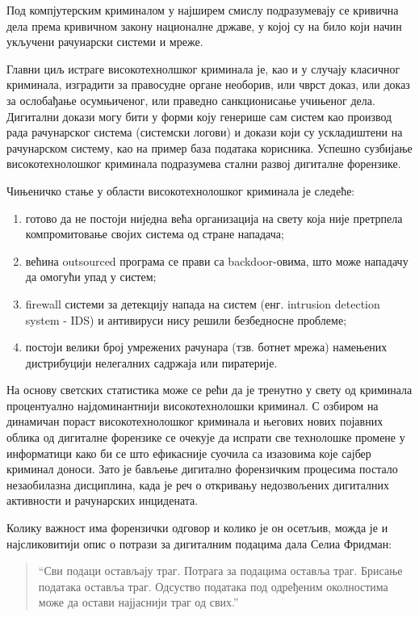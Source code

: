 \documentclass[a4paper]{article}
\begin{document}
        Под компјутерским криминалом у најширем смислу подразумевају се кривична дела према кривичном закону националне државе, у којој су на било који начин укључени рачунарски системи и мреже.

        Главни циљ истраге високотехнолшког криминала је, као и у случају класичног криминала, изградити за правосудне органе необорив, или чврст доказ, или доказ за ослобађање осумњиченог, или праведно санкционисање учињеног дела.
        Дигитални докази могу бити у форми коју генерише сам систем као производ рада рачунарског система (системски логови) и докази који су ускладиштени на рачунарском систему, као на пример база података корисника.
        Успешно сузбијање високотехнолошког криминала подразумева стални развој дигиталне форензике. 
        
        Чињеничко стање у области високотехнолошког криминала је следеће:
        \begin{enumerate}
            \item готово да не постоји ниједна већа организација на свету која није претрпела компромитовање својих система од стране нападача;
            \item већина outsourced програма се прави са backdoor-овима, што може нападачу да омогући упад у систем;
            \item firewall системи за детекцију напада на систем (енг. intrusion detection system - IDS) и антивируси нису решили безбедносне проблеме;
            \item постоји велики број умрежених рачунара (тзв. ботнет мрежа) намењених дистрибуцији нелегалних садржаја или пиратерије.
        \end{enumerate}
        На основу светских статистика може се рећи да је тренутно у свету од криминала процентуално најдоминантнији високотехнолошки криминал. С озбиром на динамичан пораст високотехнолошког криминала и његових нових појавних облика од дигиталне форензике се очекује да испрати све технолошке промене у информатици како би се што ефикасније суочила са изазовима које сајбер криминал доноси. Зато је бављење дигитално форензичким процесима постало незаобилазна дисциплина, када је реч о откривању недозвољених дигиталних активности и рачунарских инцидената.

        Колику важност има форензички одговор и колико је он осетљив, можда је и најсликовитији опис о потрази за дигиталним подацима дала Селиа Фридман:\cite{cfridmancitat}
        \begin{quote}
        “Сви подаци остављају траг. Потрага за подацима оставља траг. Брисање података оставља траг. Одсуство података под одређеним околностима може да остави најјаснији траг од свих.”
        \end{quote}
        
\end{document}
